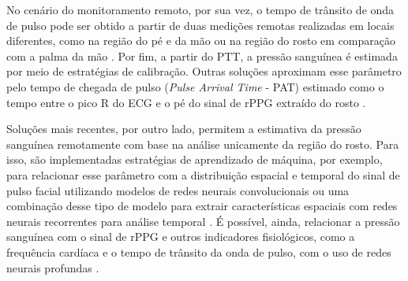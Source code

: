 No cenário do monitoramento remoto, por sua vez, o tempo de trânsito de onda de pulso  pode ser obtido a partir de duas medições remotas realizadas em locais diferentes, como na região do pé e da mão \cite{murakami2015non} ou na região do rosto em comparação com a palma da mão \cite{fan2020robust}. Por fim, a partir do PTT, a pressão sanguínea é estimada por meio de estratégias de calibração. Outras soluções aproximam esse parâmetro pelo tempo de chegada de pulso (\textit{Pulse Arrival Time} - PAT) estimado como o tempo entre o pico R do ECG e o pé do sinal de rPPG extraído do rosto \cite{secerbegovic2016blood}.

Soluções mais recentes, por outro lado, permitem a estimativa da pressão sanguínea remotamente com base na análise unicamente da região do rosto. Para isso, são implementadas estratégias de aprendizado de máquina, por exemplo, para relacionar esse parâmetro com a distribuição espacial e temporal do sinal de pulso facial utilizando modelos de redes neurais convolucionais \cite{iuchi2022blood} ou uma combinação desse tipo de modelo para extrair características espaciais com redes neurais recorrentes para análise temporal \cite{hamoud2023neural}. É possível, ainda, relacionar a pressão sanguínea com o sinal de rPPG e outros indicadores fisiológicos, como a frequência cardíaca e o tempo de trânsito da onda de pulso, com o uso de redes neurais profundas \cite{wu2022facial}.


